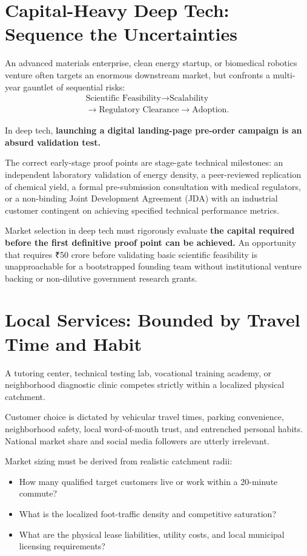 \section{Capital-Heavy Deep Tech: Sequence the Uncertainties}

An advanced materials enterprise, clean energy startup, or biomedical robotics venture often targets an enormous downstream market, but confronts a multi-year gauntlet of sequential risks:
\begin{multline}
\label{eq:deep_tech_sequence}
\text{Scientific Feasibility} \to \text{Scalability} \\
\to \text{Regulatory Clearance} \to \text{Adoption}.
\end{multline}

In deep tech, \textbf{launching a digital landing-page pre-order campaign is an absurd validation test.}

The correct early-stage proof points are stage-gate technical milestones: an independent laboratory validation of energy density, a peer-reviewed replication of chemical yield, a formal pre-submission consultation with medical regulators, or a non-binding Joint Development Agreement (JDA) with an industrial customer contingent on achieving specified technical performance metrics.

Market selection in deep tech must rigorously evaluate \textbf{the capital required before the first definitive proof point can be achieved.} An opportunity that requires ₹50 crore before validating basic scientific feasibility is unapproachable for a bootstrapped founding team without institutional venture backing or non-dilutive government research grants.

\section{Local Services: Bounded by Travel Time and Habit}

A tutoring center, technical testing lab, vocational training academy, or neighborhood diagnostic clinic competes strictly within a localized physical catchment.

Customer choice is dictated by vehicular travel times, parking convenience, neighborhood safety, local word-of-mouth trust, and entrenched personal habits. National market share and social media followers are utterly irrelevant.

Market sizing must be derived from realistic catchment radii:
\begin{itemize}[leftmargin=12pt,itemsep=1pt,topsep=1pt]
  \item How many qualified target customers live or work within a 20-minute commute?
  \item What is the localized foot-traffic density and competitive saturation?
  \item What are the physical lease liabilities, utility costs, and local municipal licensing requirements?
\end{itemize}

